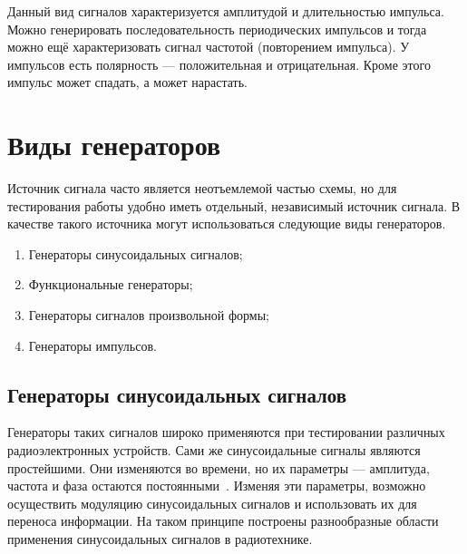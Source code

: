 	Данный вид сигналов характеризуется амплитудой и длительностью импульса. Можно генерировать последовательность периодических импульсов и тогда можно ещё характеризовать сигнал частотой (повторением импульса). У импульсов есть полярность --- положительная и отрицательная. Кроме этого импульс может спадать, а может нарастать. 
	


%
%


\section{Виды генераторов}
	Источник сигнала часто является неотъемлемой частью схемы, но для тестирования работы удобно иметь отдельный, независимый источник сигнала. В качестве такого источника могут использоваться следующие виды генераторов.
\begin{enumerate}
	\item Генераторы синусоидальных сигналов;
	\item Функциональные генераторы;
	\item Генераторы сигналов произвольной формы;
	\item Генераторы импульсов.
\end{enumerate}

\subsection{Генераторы синусоидальных сигналов}
	Генераторы таких сигналов широко применяются при тестировании различных радиоэлектронных устройств. Сами же синусоидальные сигналы являются простейшими. Они изменяются во времени, но их параметры --- амплитуда, частота и фаза остаются постоянными~\cite{dgs}. Изменяя эти параметры, возможно осуществить модуляцию синусоидальных сигналов и использовать их для переноса информации. На таком принципе построены разнообразные области применения синусоидальных сигналов в радиотехнике.

